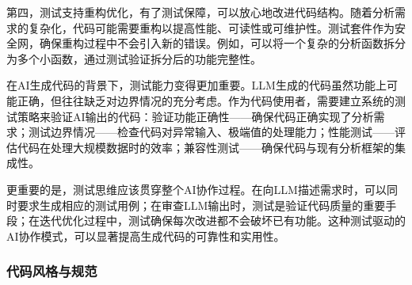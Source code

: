 \documentclass[
  twoside]{book}
\begin{document}
第四，测试支持重构优化，有了测试保障，可以放心地改进代码结构。随着分析需求的复杂化，代码可能需要重构以提高性能、可读性或可维护性。测试套件作为安全网，确保重构过程中不会引入新的错误。例如，可以将一个复杂的分析函数拆分为多个小函数，通过测试验证拆分后的功能完整性。

在AI生成代码的背景下，测试能力变得更加重要。LLM生成的代码虽然功能上可能正确，但往往缺乏对边界情况的充分考虑。作为代码使用者，需要建立系统的测试策略来验证AI输出的代码：验证功能正确性------确保代码正确实现了分析需求；测试边界情况------检查代码对异常输入、极端值的处理能力；性能测试------评估代码在处理大规模数据时的效率；兼容性测试------确保代码与现有分析框架的集成性。

更重要的是，测试思维应该贯穿整个AI协作过程。在向LLM描述需求时，可以同时要求生成相应的测试用例；在审查LLM输出时，测试是验证代码质量的重要手段；在迭代优化过程中，测试确保每次改进都不会破坏已有功能。这种测试驱动的AI协作模式，可以显著提高生成代码的可靠性和实用性。

\hypertarget{ux4ee3ux7801ux98ceux683cux4e0eux89c4ux8303}{%
\subsubsection{代码风格与规范}\label{ux4ee3ux7801ux98ceux683cux4e0eux89c4ux8303}}
\end{document}
